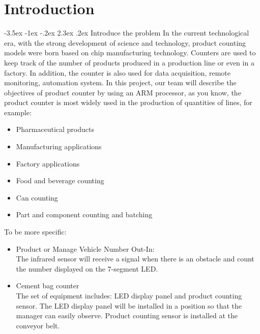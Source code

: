 \documentclass[a4paper,twoside]{report}
\makeatletter
\renewcommand\section{\@startsection {section}{1}{-1em}%
  {-3.5ex \@plus -1ex \@minus -.2ex}%
  {2.3ex \@plus.2ex}%
  {\normalfont\Large\bfseries}}
\makeatother
\begin{document}
\chapter{Introduction}
\section{Introduce the problem}
In the current technological era, with the strong development of science and technology, product counting models were born based on chip manufacturing technology. Counters are used to keep track of the number of products produced in a production line or even in a factory. In addition, the counter is also used for data acquisition, remote monitoring, automation system. In this project, our team will describe the objectives of product counter by using an ARM processor, as you know, the product counter is most widely used in the production of quantities of lines, for example:
\begin{itemize}
\item Pharmaceutical products
\item Manufacturing applications
\item Factory applications
\item Food and beverage counting
\item Can counting
\item Part and component counting and batching
\end{itemize}

To be more specific:
\begin{itemize}
\item Product or Manage Vehicle Number Out-In:\\
    The infrared sensor will receive a signal when there is an obstacle and count the number displayed on the 7-segment LED.
\item Cement bag counter\\
    The set of equipment includes: LED display panel and product counting sensor. The LED display panel will be installed in a position so that the manager can easily observe. Product counting sensor is installed at the conveyor belt.
\end{itemize}
\end{document}
